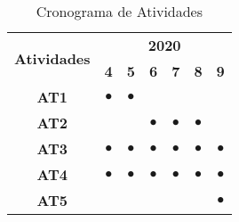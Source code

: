 \begin{table}[h!]
    \centering
    \footnotesize
    \def \arraystretch{1.0}
    \caption{Cronograma de Atividades}
    \begin{tabular}{|c|c|c|c|c|c|c|}
        \hline
        \multirow{2}{*}{\bf Atividades} &  \multicolumn{6}{c|}{\bf 2020} \\ \cline{2-9} 
        & \bf 4 & \bf 5 & \bf 6 & \bf 7 & \bf 8 & \bf 9 \\  
        \hline
        \bf AT1 & $\bullet$ & $\bullet$ &  &  &  & \\
        \hline
        \bf AT2 &  &  & $\bullet$ & $\bullet$ & $\bullet$ & \\
        \hline
        \bf AT3 & $\bullet$ & $\bullet$ & $\bullet$ & $\bullet$ & $\bullet$ & $\bullet$ \\
        \hline
        \bf AT4 & $\bullet$ & $\bullet$ & $\bullet$ & $\bullet$ & $\bullet$ & $\bullet$ \\
        \hline
        \bf AT5 &  &  &  &  &  & $\bullet$ \\
        \hline
    \end{tabular}
    \label{tabela_cronograma}
\end{table}